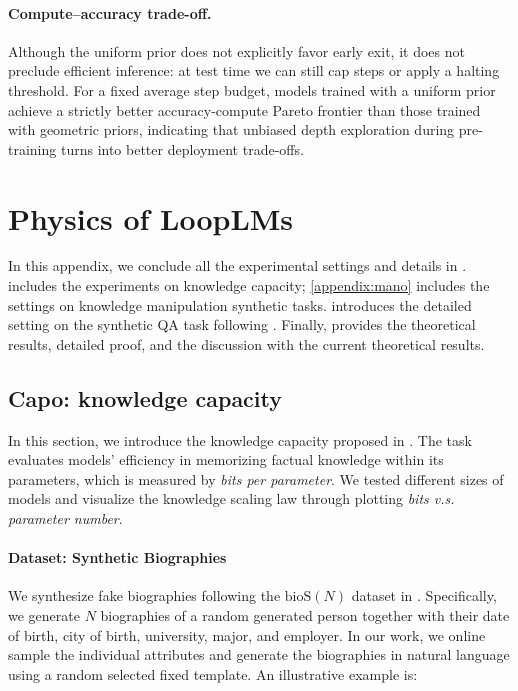 \documentclass[]{bytedance_seed}
\newcommand{\1}{\mathbf{1}}
\newcommand{\ut}{LoopLM}
\begin{document}
{\paragraph{Compute--accuracy trade-off.}
Although the uniform prior does not explicitly favor early exit, it does not preclude efficient inference: at test time we can still cap steps or apply a halting threshold.
For a fixed average step budget, models trained with a uniform prior achieve a strictly better accuracy-compute Pareto frontier than those trained with geometric priors, indicating that unbiased depth exploration during pre-training turns into better deployment trade-offs.
\section{Physics of \ut{}s}
\label{appendix:physics}
In this appendix, we conclude all the experimental settings and details in .  includes the experiments on knowledge capacity; \cref{appendix:mano} includes the settings on knowledge manipulation synthetic tasks.  introduces the detailed setting on the synthetic QA task following \cite{yao2025language}. Finally,  provides the theoretical results, detailed proof, and the discussion with the current theoretical results.
\subsection{Capo: knowledge capacity}
\label{appendix:capo}
In this section, we introduce the knowledge capacity proposed in \cite{AL2024-knowledge3,Allenzhu2025-canon}. The task evaluates models' efficiency in memorizing factual knowledge within its parameters, which is measured by  \textit{bits per parameter}. We tested different sizes of models and visualize the knowledge scaling law through plotting \textit{bits v.s. parameter number}.

\paragraph{Dataset: Synthetic Biographies} We synthesize fake biographies following the $\mathrm{bioS}(N)$ dataset in \cite{AL2024-knowledge3}. Specifically, we generate $N$ biographies of a random generated person together with their date of birth, city of birth, university, major, and employer. In our work, we online sample the individual attributes and generate the biographies in natural language using a random selected fixed template. An illustrative example is:

}
\end{document}
